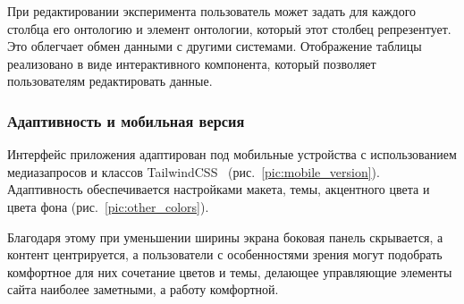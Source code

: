 При редактировании эксперимента пользователь может задать для каждого столбца его онтологию и элемент онтологии, который этот столбец репрезентует. Это облегчает обмен данными с другими системами. Отображение таблицы реализовано в виде интерактивного компонента, который позволяет пользователям редактировать данные.


\subsubsection{Адаптивность и мобильная версия}

Интерфейс приложения адаптирован под мобильные устройства с использованием медиазапросов и классов TailwindCSS~\cite{Library:TailwindCSS} (рис.~\ref{pic:mobile_version}). Адаптивность обеспечивается настройками макета, темы, акцентного цвета и цвета фона (рис.~\ref{pic:other_colors}).

Благодаря этому при уменьшении ширины экрана боковая панель скрывается, а контент центрируется, а пользователи с особенностями зрения могут подобрать комфортное для них сочетание цветов и темы, делающее управляющие элементы сайта наиболее заметными, а работу комфортной.

